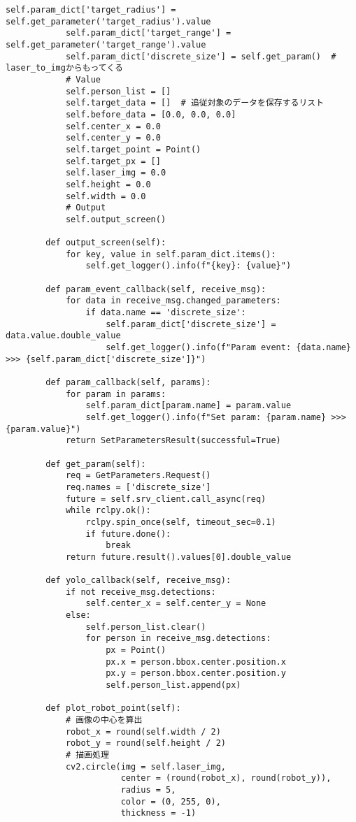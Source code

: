 \begin{lstlisting}[caption=person\_detector.py, label=person]
            self.param_dict['target_radius'] = self.get_parameter('target_radius').value
            self.param_dict['target_range'] = self.get_parameter('target_range').value
            self.param_dict['discrete_size'] = self.get_param()  # laser_to_imgからもってくる
            # Value
            self.person_list = []
            self.target_data = []  # 追従対象のデータを保存するリスト
            self.before_data = [0.0, 0.0, 0.0]
            self.center_x = 0.0
            self.center_y = 0.0
            self.target_point = Point()
            self.target_px = []
            self.laser_img = 0.0
            self.height = 0.0
            self.width = 0.0
            # Output
            self.output_screen()
    
        def output_screen(self):
            for key, value in self.param_dict.items():
                self.get_logger().info(f"{key}: {value}")
    
        def param_event_callback(self, receive_msg):
            for data in receive_msg.changed_parameters:
                if data.name == 'discrete_size':
                    self.param_dict['discrete_size'] = data.value.double_value
                    self.get_logger().info(f"Param event: {data.name} >>> {self.param_dict['discrete_size']}")
    
        def param_callback(self, params):
            for param in params:
                self.param_dict[param.name] = param.value
                self.get_logger().info(f"Set param: {param.name} >>> {param.value}")
            return SetParametersResult(successful=True)
        
        def get_param(self):
            req = GetParameters.Request()
            req.names = ['discrete_size']
            future = self.srv_client.call_async(req)
            while rclpy.ok():
                rclpy.spin_once(self, timeout_sec=0.1)
                if future.done():
                    break
            return future.result().values[0].double_value
    
        def yolo_callback(self, receive_msg):
            if not receive_msg.detections:
                self.center_x = self.center_y = None
            else:
                self.person_list.clear()
                for person in receive_msg.detections:
                    px = Point()
                    px.x = person.bbox.center.position.x
                    px.y = person.bbox.center.position.y
                    self.person_list.append(px)
    
        def plot_robot_point(self):
            # 画像の中心を算出
            robot_x = round(self.width / 2)
            robot_y = round(self.height / 2)
            # 描画処理
            cv2.circle(img = self.laser_img,
                       center = (round(robot_x), round(robot_y)),
                       radius = 5,
                       color = (0, 255, 0),
                       thickness = -1)
    

\end{lstlisting}

